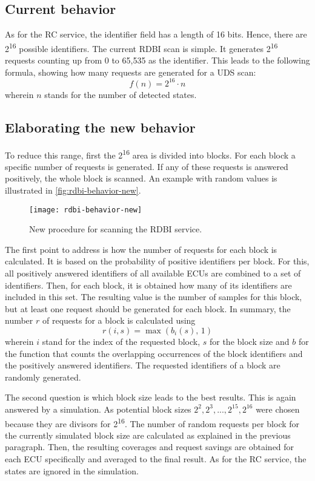 \subsection{Current behavior}

As for the RC service, the identifier field has a length of 16 bits. Hence, there are 2\textsuperscript{16} possible identifiers.
The current RDBI scan is simple. It generates 2\textsuperscript{16} requests counting up from 0 to 65,535 as the identifier. This leads to the following formula, showing how many requests are generated for a UDS scan:
\[f(n)=2^{16} \cdot n\]
wherein $n$ stands for the number of detected states. 

\subsection{Elaborating the new behavior}
\label{subsubsec:rdbi-behavior}

To reduce this range, first the 2\textsuperscript{16} area is divided into blocks. For each block a specific number of requests is generated. If any of these requests is answered positively, the whole block is scanned. An example with random values is illustrated in \autoref{fig:rdbi-behavior-new}.

\begin{figure}[htb]
    \centering
    \texttt{[image: rdbi-behavior-new]}
    \caption{New procedure for scanning the RDBI service.}
    \label{fig:rdbi-behavior-new}
\end{figure}

The first point to address is how the number of requests for each block is calculated. It is based on the probability of positive identifiers per block. For this, all positively answered identifiers of all available ECUs are combined to a set of identifiers. Then, for each block, it is obtained how many of its identifiers are included in this set. The resulting value is the number of samples for this block, but at least one request should be generated for each block. In summary, the number $r$ of requests for a block is calculated using
\[r(i, s)=\max(b_i(s), \,1)\]
wherein $i$ stand for the index of the requested block, $s$ for the block size and $b$ for the function that counts the overlapping occurrences of the block identifiers and the positively answered identifiers. The requested identifiers of a block are randomly generated.

The second question is which block size leads to the best results. This is again answered by a simulation. As potential block sizes $2^2, 2^3, ..., 2^{15}, 2^{16}$ were chosen because they are divisors for 2\textsuperscript{16}. The number of random requests per block for the currently simulated block size are calculated as explained in the previous paragraph. Then, the resulting coverages and request savings are obtained for each ECU specifically and averaged to the final result. As for the RC service, the states are ignored in the simulation.


